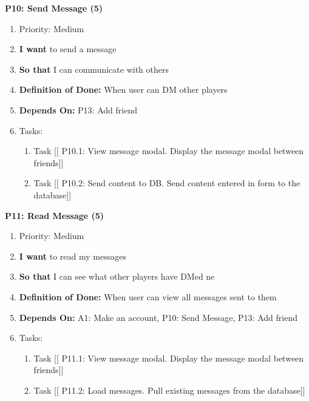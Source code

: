 \textbf{P10: Send Message (5)}
\begin{enumerate}
    \item Priority: Medium
    \item \textbf{I want} to send a message
    \item \textbf{So that} I can communicate with others
    \item \textbf{Definition of Done:} When user can DM other players
    \item \textbf{Depends On:} P13: Add friend
    \item Tasks:
    \begin{enumerate}
        \item Task [[ P10.1: View message modal. Display the message modal between friends]]
        \item Task [[ P10.2: Send content to DB. Send content entered in form to the database]]
    \end{enumerate}
\end{enumerate}

\vspace{2em}

\textbf{P11: Read Message (5)}
\begin{enumerate}
    \item Priority: Medium
    \item \textbf{I want} to read my messages
    \item \textbf{So that} I can see what other players have DMed ne
    \item \textbf{Definition of Done:} When user can view all messages sent to them
    \item \textbf{Depends On:} A1: Make an account, P10: Send Message, P13: Add friend
    \item Tasks:
    \begin{enumerate}
        \item Task [[ P11.1: View message modal. Display the message modal between friends]]
        \item Task [[ P11.2: Load messages. Pull existing messages from the database]]
    \end{enumerate}
\end{enumerate}

\vspace{2em}

